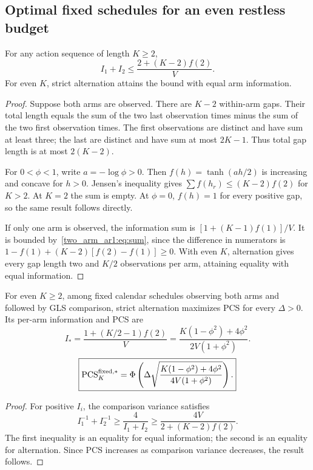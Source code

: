 \subsection{Optimal fixed schedules for an even restless budget}
\begin{lemma}
For any action sequence of length $K\geq2$,
\begin{equation}
I_1+I_2\leq\frac{2+(K-2)f(2)}V.
\label{two_arm_ar1:eq:sum}
\end{equation}
For even $K$, strict alternation attains the bound with equal arm information.
\end{lemma}
\begin{proof}
Suppose both arms are observed. There are $K-2$ within-arm gaps. Their total length equals the sum of the two last observation times minus the sum of the two first observation times. The first observations are distinct and have sum at least three; the last are distinct and have sum at most $2K-1$. Thus total gap length is at most $2(K-2)$.

For $0<\phi<1$, write $a=-\log\phi>0$. Then $f(h)=\tanh(ah/2)$ is increasing and concave for $h>0$. Jensen's inequality gives
$\sum f(h_r)\leq(K-2)f(2)$ for $K>2$. At $K=2$ the sum is empty. At $\phi=0$, $f(h)=1$ for every positive gap, so the same result follows directly.

If only one arm is observed, the information sum is
$[1+(K-1)f(1)]/V$. It is bounded by~\eqref{two_arm_ar1:eq:sum}, since the difference in numerators is
$1-f(1)+(K-2)[f(2)-f(1)]\geq0$.
With even $K$, alternation gives every gap length two and $K/2$ observations per arm, attaining equality with equal information.
\end{proof}

\begin{theorem}
For even $K\geq2$, among fixed calendar schedules observing both arms and followed by GLS comparison, strict alternation maximizes PCS for every $\Delta>0$. Its per-arm information and PCS are
\begin{equation}
I_*=\frac{1+(K/2-1)f(2)}V
=\frac{K(1-\phi^2)+4\phi^2}{2V(1+\phi^2)}.\label{two_arm_ar1:eq:Istar}
\end{equation}
\begin{equation}
\boxed{\operatorname{PCS}_K^{\mathrm{fixed},*}
=\Phi\left(\Delta\sqrt{
\frac{K(1-\phi^2)+4\phi^2}{4V(1+\phi^2)}}\right).}
\label{two_arm_ar1:eq:pcs-fixed}
\end{equation}
\end{theorem}
\begin{proof}
For positive $I_i$, the comparison variance satisfies
\[
I_1^{-1}+I_2^{-1}\geq\frac4{I_1+I_2}
\geq\frac{4V}{2+(K-2)f(2)}.
\]
The first inequality is an equality for equal information; the second is an equality for alternation. Since PCS increases as comparison variance decreases, the result follows.
\end{proof}

